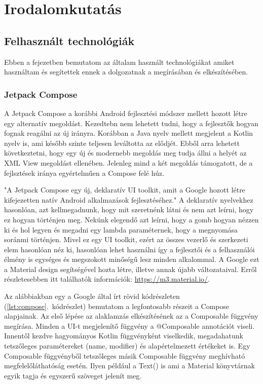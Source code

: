 \chapter{Irodalomkutatás}
\label{sec:Search}

\section{Felhasznált technológiák}
\label{sec:Technologies}

Ebben a fejezetben bemutatom az általam használt technológiákat amiket használtam és segítettek ennek a dolgozatnak a megírásában és elkészítésében.

\subsection{Jetpack Compose}
\label{sec:Compose}

A Jetpack Compose a korábbi Android fejlesztési módszer mellett hozott létre egy alternatív megoldást.
Kezedtebn nem lehetett tudni, hogy a fejlesztők hogyan fognak reagálni az új irányra.
Korábban a Java nyelv mellett megjelent a Kotlin nyelv is, ami később szinte teljesen leváltotta az elődjét.
Ebből arra lehetett következtetni, hogy egy új és modernebb megoldás meg tudja állni a helyét az XML View megoldást ellenében.
Jelenleg mind a két megoldás támogatott, de a fejlsztések iránya egyértelműen a Compose felé húz.

"A Jetpack Compose egy új, deklaratív UI toolkit, amit a Google hozott létre kifejezetten natív Android alkalmazások fejlesztéséhez."\cite{GettingStartedWithJetpackCompose}
A deklaratív nyelvekhez hasonlóan, azt kellmegadnunk, hogy mit szeretnénk látni és nem azt leírni, hogy ez hogyan történjen meg.
Nekünk elegendő azt leírni, hogy a gomb hogyan nézzen ki és hol legyen és megadni egy lambda paraméternek, hogy a megnyomása soránmi történjen.
Mivel ez egy UI toolkit, ezért az összes vezerlő és szerkezeti elem hasonlóan néz ki, hasonlóan lehet használni így a fejlesztői és a felhasználói élmény is egységes és megszokott minőségű lesz minden alkalommal.
A Google ezt a Material design segítségével hozta létre, illetve annak újabb változataival. Erről részletesebben itt találhatók információk: \url{https://m3.material.io/}.

Az alábbiakban egy a Google által írt rövid kódrészleten (\ref{lst:compose}.~kódrészlet) bemutatom a legfontosabb részeit a Compose alapjainak.\cite{BasicCodelab}
Az első lépése az alaklamzás elkészítésének az a Composable függvény megírása.
Minden a UI-t megjelenítő függvény a @Composable annotációt viseli.
Innentől kezdve hagyományos Kotlin függvényként viselkedik, megadahatunk tetszőleges paramétereket (name, modifier) és alapértelmezett értékeket is.
Egy Composable függvényből tetszőleges másik Composable függvény meghívható megfelelőláthatóság esetén.
Ilyen például a Text() is ami a Material könyvtárnak egyik tagja és egyszerű szöveget jelenít meg.

